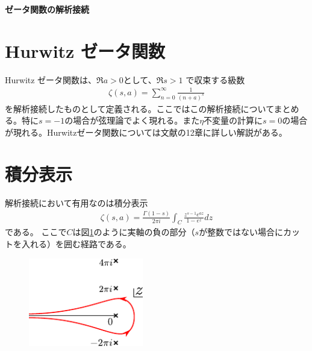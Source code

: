 \documentclass[pandoc,nomag,12pt,a4paper]{bxjsarticle}
\begin{document}
{\bfseries \LARGE ゼータ関数の解析接続}
\section{Hurwitz ゼータ関数}
Hurwitz ゼータ関数は、$\Re a>0$として、$\Re s>1$ で収束する級数
\begin{align}
  \zeta(s,a)=\sum_{n=0}^{\infty}\frac{1}{(n+a)^s}
  \label{zeta}
\end{align}
を解析接続したものとして定義される。ここではこの解析接続についてまとめる。特に$s=-1$の場合が弦理論でよく現れる。また$\eta$不変量の計算に$s=0$の場合が現れる。Hurwitzゼータ関数については文献\cite{Apostol}の12章に詳しい解説がある。
\section{積分表示}
解析接続において有用なのは積分表示
\begin{align}
  \zeta(s,a)=\frac{\Gamma(1-s)}{2\pi i}\int_C \frac{z^{s-1}e^{az}}{1-e^{z}}dz
\label{integral-representation}
\end{align}
である。
ここで$C$は図\ref{fig:contour}のように実軸の負の部分（$s$が整数ではない場合にカットを入れる）を囲む経路である。
\begin{figure}[htbp]
  \centering
  \includegraphics[width=5cm]{path.pdf}
  \caption{}
  \label{fig:contour}
\end{figure}
\end{document}
